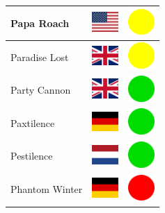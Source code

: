\documentclass[12pt, a4paper, twoside]{report}
\begin{document}
\begin{center}
\begin{longtable}{|p{5cm}|p{2cm}|p{2cm}|}
Papa Roach & \includegraphics[width=1cm]{4x3/us} & \includegraphics[width=1cm]{likes/m} \\ \hline
Paradise Lost & \includegraphics[width=1cm]{4x3/gb} & \includegraphics[width=1cm]{likes/m} \\ \hline
Party Cannon & \includegraphics[width=1cm]{4x3/gb} & \includegraphics[width=1cm]{likes/y} \\ \hline
Paxtilence & \includegraphics[width=1cm]{4x3/de} & \includegraphics[width=1cm]{likes/y} \\ \hline
Pestilence & \includegraphics[width=1cm]{4x3/nl} & \includegraphics[width=1cm]{likes/y} \\ \hline
Phantom Winter & \includegraphics[width=1cm]{4x3/de} & \includegraphics[width=1cm]{likes/n} \\ \hline

\end{longtable}
\end{center}
\end{document}
